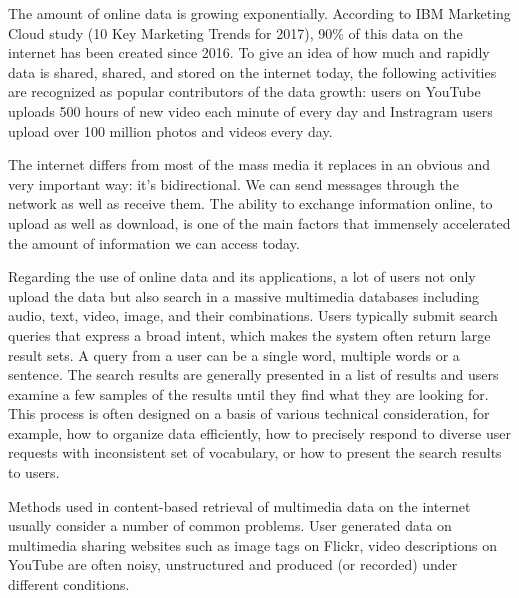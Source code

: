 
The amount of online data is growing exponentially. According to IBM Marketing Cloud study (10 Key Marketing Trends for 2017), 90\% of this data on the internet has been created since 2016. To give an idea of how much and rapidly data is shared, shared, and stored on the internet today, the following activities are recognized as popular contributors of the data growth: users on YouTube uploads 500 hours of new video each minute of every day and Instragram users upload over 100 million photos and videos every day. 

The internet differs from most of the mass media it replaces in an obvious and very important way: it's bidirectional. We can send messages through the network as well as receive them. The ability to exchange information online, to upload as well as download, is one of the main factors that immensely accelerated the amount of information we can access today.

Regarding the use of online data and its applications, a lot of users not only upload the data but also search in a massive multimedia databases including audio, text, video, image, and their combinations.  
Users typically submit search queries that express a broad intent, which makes the system often return large result sets. A query from a user can be a single word, multiple words or a sentence. The search results are generally presented in a list of results and users examine a few samples of the results until they find what they are looking for. This process is often designed on a basis of various technical consideration, for example, how to organize data efficiently, how to precisely respond to diverse user requests with inconsistent set of vocabulary, or how to present the search results to users.

Methods used in content-based retrieval of multimedia data on the internet usually consider a number of common problems. User generated data on multimedia sharing websites such as image tags on Flickr, video descriptions on YouTube are often noisy, unstructured and produced (or recorded) under different conditions.
\newpage


